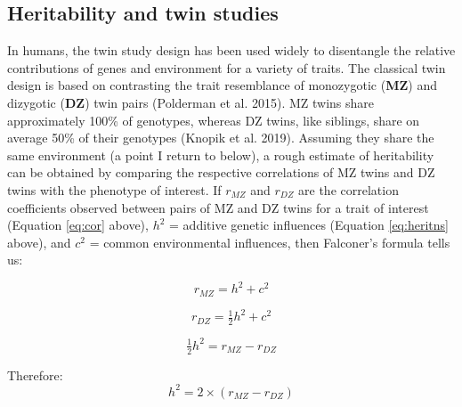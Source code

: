 \documentclass[
]{book}
\begin{document}
\hypertarget{heritability-and-twin-studies}{%
\subsection{Heritability and twin studies}\label{heritability-and-twin-studies}}

In humans, the twin study design has been used widely to disentangle the relative contributions of genes and environment for a variety of traits. The classical twin design is based on contrasting the trait resemblance of monozygotic (\textbf{MZ}) and dizygotic (\textbf{DZ}) twin pairs (Polderman et al. 2015). MZ twins share approximately 100\% of genotypes, whereas DZ twins, like siblings, share on average 50\% of their genotypes (Knopik et al. 2019). Assuming they share the same environment (a point I return to below), a rough estimate of heritability can be obtained by comparing the respective correlations of MZ twins and DZ twins with the phenotype of interest. If \(r_{MZ}\) and \(r_{DZ}\) are the correlation coefficients observed between pairs of MZ and DZ twins for a trait of interest (Equation \eqref{eq:cor} above), \(h^2\) = additive genetic influences (Equation \eqref{eq:heritns} above), and \(c^2\) = common environmental influences, then Falconer's formula tells us:

\begin{equation}
r_{MZ} = h^2 + c^2
\end{equation}

\begin{equation}
r_{DZ} = \tfrac{1}{2}h^2 + c^2
\end{equation}

\begin{equation}
\tfrac{1}{2}h^2 = r_{MZ} - r_{DZ}
\end{equation}

Therefore:
\begin{equation}
h^2 = 2\times(r_{MZ} - r_{DZ})
\end{equation}
\end{document}
